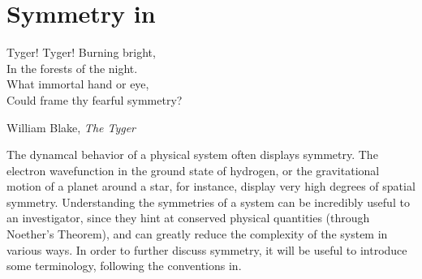 \chapter{Symmetry in \pCf}	
\epigraph{Tyger! Tyger! Burning bright, \\
		In the forests of the night. \\
		What immortal hand or eye,\\
		Could frame thy fearful symmetry?}{William Blake, \emph{The Tyger}} 
The dynamcal behavior of a physical system often displays symmetry. The electron wavefunction in the ground state of hydrogen, or the gravitational motion of a planet around a star, for instance, display very high degrees of spatial symmetry.  Understanding the symmetries of a system can be incredibly useful to an investigator, since they hint at conserved physical quantities (through Noether's Theorem), and can greatly reduce the complexity of the system in various ways. In order to further discuss symmetry, it will be useful to introduce some terminology, following the conventions in\cite{Rotman1995}.  \\

